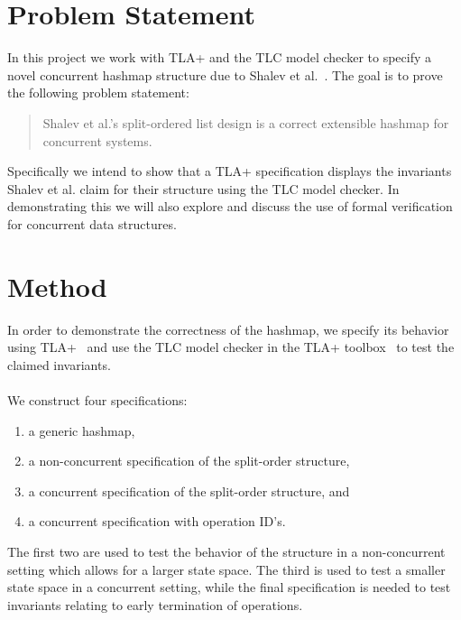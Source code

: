 \documentclass{uit-thesis}
\begin{document}
\section{Problem Statement}\label{sec:problem-statement}
In this project we work with TLA+ and the TLC model checker to specify a novel concurrent hashmap structure due to Shalev et al.~\cite{Shalev2006}. The goal is to prove the following problem statement:
\begin{quote}
    Shalev et al.'s split-ordered list design is a correct extensible hashmap for concurrent systems.
\end{quote}
Specifically we intend to show that a TLA+ specification displays the invariants Shalev et al. claim for their structure using the TLC model checker. In demonstrating this we will also explore and discuss the use of formal verification for concurrent data structures.

\section{Method}
In order to demonstrate the correctness of the hashmap, we specify its behavior using TLA+~\cite{Lamport_specifying_2002} and use the TLC model checker in the TLA+ toolbox~\cite{TLAplus} to test the claimed invariants.
\\\\
We construct four specifications:
\begin{enumerate}
    \item a generic hashmap,
    \item a non-concurrent specification of the split-order structure,
    \item a concurrent specification of the split-order structure, and
    \item a concurrent specification with operation ID's.
\end{enumerate}
The first two are used to test the behavior of the structure in a non-concurrent setting which allows for a larger state space. The third is used to test a smaller state space in a concurrent setting, while the final specification is needed to test invariants relating to early termination of operations.
\end{document}
